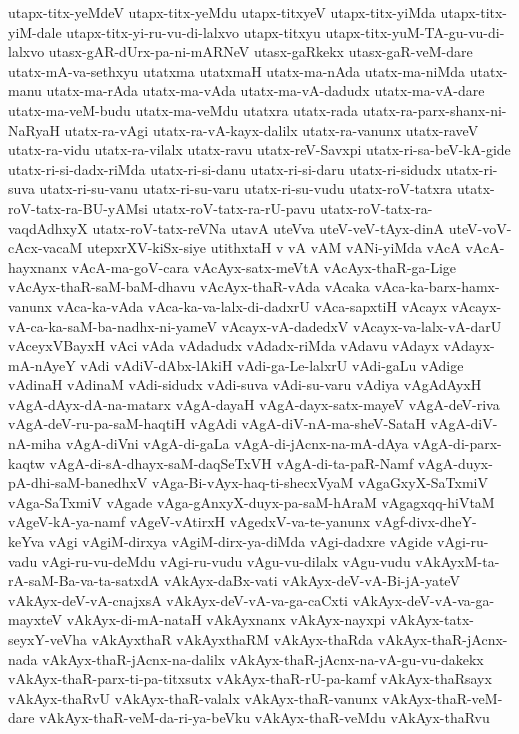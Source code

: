 {utapx-titx-yeMdeV
utapx-titx-yeMdu
utapx-titxyeV
utapx-titx-yiMda
utapx-titx-yiM-dale
utapx-titx-yi-ru-vu-di-lalxvo
utapx-titxyu
utapx-titx-yuM-TA-gu-vu-di-lalxvo
utasx-gAR-dUrx-pa-ni-mARNeV
utasx-gaRkekx
utasx-gaR-veM-dare
utatx-mA-va-sethxyu
utatxma
utatxmaH
utatx-ma-nAda
utatx-ma-niMda
utatx-manu
utatx-ma-rAda
utatx-ma-vAda
utatx-ma-vA-dadudx
utatx-ma-vA-dare
utatx-ma-veM-budu
utatx-ma-veMdu
utatxra
utatx-rada
utatx-ra-parx-shanx-ni-NaRyaH
utatx-ra-vAgi
utatx-ra-vA-kayx-dalilx
utatx-ra-vanunx
utatx-raveV
utatx-ra-vidu
utatx-ra-vilalx
utatx-ravu
utatx-reV-Savxpi
utatx-ri-sa-beV-kA-gide
utatx-ri-si-dadx-riMda
utatx-ri-si-danu
utatx-ri-si-daru
utatx-ri-sidudx
utatx-ri-suva
utatx-ri-su-vanu
utatx-ri-su-varu
utatx-ri-su-vudu
utatx-roV-tatxra
utatx-roV-tatx-ra-BU-yAMsi
utatx-roV-tatx-ra-rU-pavu
utatx-roV-tatx-ra-vaqdAdhxyX
utatx-roV-tatx-reVNa
utavA
uteVva
uteV-veV-tAyx-dinA
uteV-voV-cAcx-vacaM
utepxrXV-kiSx-siye
utithxtaH
v
vA
vAM
vANi-yiMda
vAcA
vAcA-hayxnanx
vAcA-ma-goV-cara
vAcAyx-satx-meVtA
vAcAyx-thaR-ga-Lige
vAcAyx-thaR-saM-baM-dhavu
vAcAyx-thaR-vAda
vAcaka
vAca-ka-barx-hamx-vanunx
vAca-ka-vAda
vAca-ka-va-lalx-di-dadxrU
vAca-sapxtiH
vAcayx
vAcayx-vA-ca-ka-saM-ba-nadhx-ni-yameV
vAcayx-vA-dadedxV
vAcayx-va-lalx-vA-darU
vAceyxVBayxH
vAci
vAda
vAdadudx
vAdadx-riMda
vAdavu
vAdayx
vAdayx-mA-nAyeY
vAdi
vAdiV-dAbx-lAkiH
vAdi-ga-Le-lalxrU
vAdi-gaLu
vAdige
vAdinaH
vAdinaM
vAdi-sidudx
vAdi-suva
vAdi-su-varu
vAdiya
vAgAdAyxH
vAgA-dAyx-dA-na-matarx
vAgA-dayaH
vAgA-dayx-satx-mayeV
vAgA-deV-riva
vAgA-deV-ru-pa-saM-haqtiH
vAgAdi
vAgA-diV-nA-ma-sheV-SataH
vAgA-diV-nA-miha
vAgA-diVni
vAgA-di-gaLa
vAgA-di-jAcnx-na-mA-dAya
vAgA-di-parx-kaqtw
vAgA-di-sA-dhayx-saM-daqSeTxVH
vAgA-di-ta-paR-Namf
vAgA-duyx-pA-dhi-saM-banedhxV
vAga-Bi-vAyx-haq-ti-shecxVyaM
vAgaGxyX-SaTxmiV
vAga-SaTxmiV
vAgade
vAga-gAnxyX-duyx-pa-saM-hAraM
vAgagxqq-hiVtaM
vAgeV-kA-ya-namf
vAgeV-vAtirxH
vAgedxV-va-te-yanunx
vAgf-divx-dheY-keYva
vAgi
vAgiM-dirxya
vAgiM-dirx-ya-diMda
vAgi-dadxre
vAgide
vAgi-ru-vadu
vAgi-ru-vu-deMdu
vAgi-ru-vudu
vAgu-vu-dilalx
vAgu-vudu
vAkAyxM-ta-rA-saM-Ba-va-ta-satxdA
vAkAyx-daBx-vati
vAkAyx-deV-vA-Bi-jA-yateV
vAkAyx-deV-vA-cnajxsA
vAkAyx-deV-vA-va-ga-caCxti
vAkAyx-deV-vA-va-ga-mayxteV
vAkAyx-di-mA-nataH
vAkAyxnanx
vAkAyx-nayxpi
vAkAyx-tatx-seyxY-veVha
vAkAyxthaR
vAkAyxthaRM
vAkAyx-thaRda
vAkAyx-thaR-jAcnx-nada
vAkAyx-thaR-jAcnx-na-dalilx
vAkAyx-thaR-jAcnx-na-vA-gu-vu-dakekx
vAkAyx-thaR-parx-ti-pa-titxsutx
vAkAyx-thaR-rU-pa-kamf
vAkAyx-thaRsayx
vAkAyx-thaRvU
vAkAyx-thaR-valalx
vAkAyx-thaR-vanunx
vAkAyx-thaR-veM-dare
vAkAyx-thaR-veM-da-ri-ya-beVku
vAkAyx-thaR-veMdu
vAkAyx-thaRvu
}
